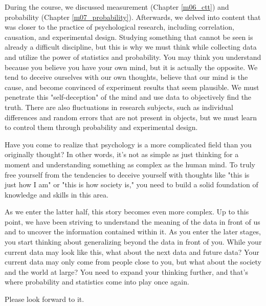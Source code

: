 \documentclass{ltjbook}
\begin{document}
During the course, we discussed measurement (Chapter \ref{m06_ctt}) and probability (Chapter \ref{m07_probability}). Afterwards, we delved into content that was closer to the practice of psychological research, including correlation, causation, and experimental design. Studying something that cannot be seen is already a difficult discipline, but this is why we must think while collecting data and utilize the power of statistics and probability. You may think you understand because you believe you have your own mind, but it is actually the opposite. We tend to deceive ourselves with our own thoughts, believe that our mind is the cause, and become convinced of experiment results that seem plausible. We must penetrate this "self-deception" of the mind and use data to objectively find the truth. There are also fluctuations in research subjects, such as individual differences and random errors that are not present in objects, but we must learn to control them through probability and experimental design.

Have you come to realize that psychology is a more complicated field than you originally thought? In other words, it's not as simple as just thinking for a moment and understanding something as complex as the human mind. To truly free yourself from the tendencies to deceive yourself with thoughts like "this is just how I am" or "this is how society is," you need to build a solid foundation of knowledge and skills in this area.

As we enter the latter half, this story becomes even more complex.
Up to this point, we have been striving to understand the meaning of the data in front of us and to uncover the information contained within it.
As you enter the later stages, you start thinking about generalizing beyond the data in front of you. While your current data may look like this, what about the next data and future data? Your current data may only come from people close to you, but what about the society and the world at large? You need to expand your thinking further, and that's where probability and statistics come into play once again.

Please look forward to it.
\end{document}
